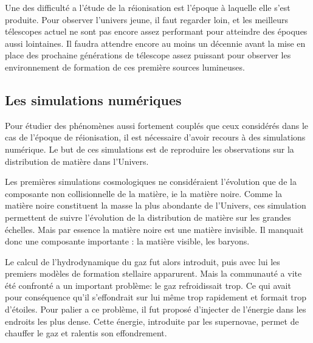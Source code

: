 
Une des difficulté a l'étude de la réionisation est l'époque à laquelle elle s'est produite. %
Pour observer l'univers jeune, il faut regarder loin, et les meilleurs télescopes actuel ne sont pas encore assez performant pour atteindre des époques aussi lointaines.
Il faudra attendre encore au moins un décennie avant la mise en place des prochaine générations de télescope assez puissant pour observer les environnement de formation de ces première sources lumineuses.




\subsection*{Les simulations numériques}
Pour étudier des phénomènes aussi fortement couplés que ceux considérés dans le cas de l'époque de réionisation, il est nécessaire d'avoir recours à des simulations numérique. 
Le but de ces simulations est de reproduire les observations sur la distribution de matière dans l'Univers.

Les premières simulations cosmologiques ne considéraient l'évolution que de la composante non collisionnelle de la matière, ie la matière noire.
Comme la matière noire constituent la masse la plus abondante de l'Univers, ces simulation permettent de suivre l'évolution de la distribution de matière sur les grandes échelles. 
Mais par essence la matière noire est une matière invisible. 
Il manquait donc une composante importante : la matière visible, les baryons.

Le calcul de l'hydrodynamique du gaz fut alors introduit, puis avec lui les premiers modèles de formation stellaire apparurent.
Mais la communauté a vite été confronté a un important problème: le gaz refroidissait trop.
Ce qui avait pour conséquence qu'il s'effondrait sur lui même trop rapidement et formait trop d'étoiles.
Pour palier a ce problème, il fut proposé d'injecter de l'énergie dans les endroits les plus dense.
Cette énergie, introduite par les supernovae, permet de chauffer le gaz et ralentis son effondrement. 

